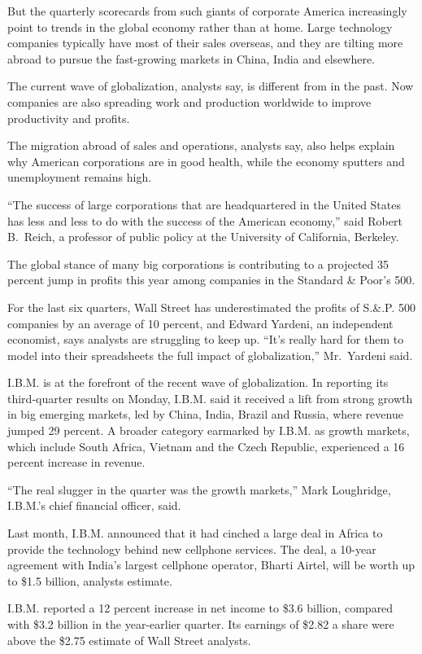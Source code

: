 ﻿\documentclass[12pt]{article}
\begin{document}
But the quarterly scorecards from such giants of corporate America increasingly point to trends in
the global economy rather than at home. Large technology companies typically have most of their
sales overseas, and they are tilting more abroad to pursue the fast-growing markets in China, India
and elsewhere.

The current wave of globalization, analysts say, is different from in the past. Now companies are
also spreading work and production worldwide to improve productivity and profits.

The migration abroad of sales and operations, analysts say, also helps explain why American
corporations are in good health, while the economy sputters and unemployment remains high.

``The success of large corporations that are headquartered in the United States has less and less to
do with the success of the American economy,'' said Robert B.~Reich, a professor of public policy at
the University of California, Berkeley.

The global stance of many big corporations is contributing to a projected 35 percent jump in profits
this year among companies in the Standard \& Poor's 500.

For the last six quarters, Wall Street has underestimated the profits of S.\&.P. 500 companies by an
average of 10 percent, and Edward Yardeni, an independent economist, says analysts are struggling to
keep up. ``It's really hard for them to model into their spreadsheets the full impact of
globalization,'' Mr.~Yardeni said.

I.B.M. is at the forefront of the recent wave of globalization. In reporting its third-quarter
results on Monday, I.B.M. said it received a lift from strong growth in big emerging markets, led by
China, India, Brazil and Russia, where revenue jumped 29 percent. A broader category earmarked by
I.B.M. as growth markets, which include South Africa, Vietnam and the Czech Republic, experienced a
16 percent increase in revenue.

``The real slugger in the quarter was the growth markets,'' Mark Loughridge, I.B.M.'s chief
financial officer, said.

Last month, I.B.M. announced that it had cinched a large deal in Africa to provide the technology
behind new cellphone services. The deal, a 10-year agreement with India's largest cellphone
operator, Bharti Airtel, will be worth up to \$1.5 billion, analysts estimate.

I.B.M. reported a 12 percent increase in net income to \$3.6 billion, compared with \$3.2 billion in
the year-earlier quarter. Its earnings of \$2.82 a share were above the \$2.75 estimate of Wall
Street analysts.
\end{document}
